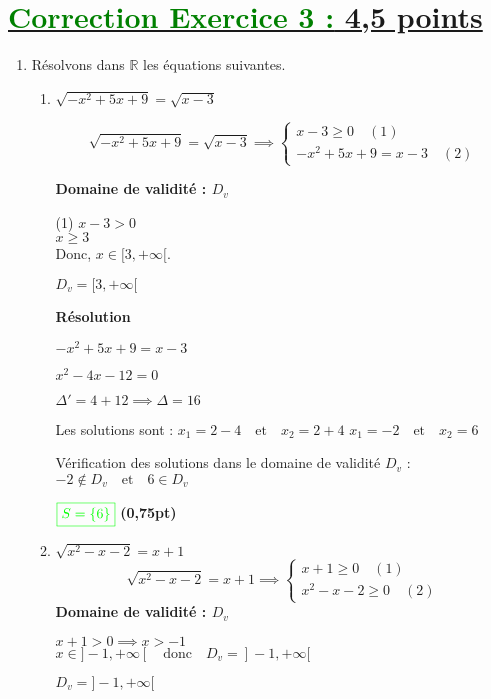 \documentclass[12pt,a4paper]{article}
\begin{document}
\section*{\underline{\textcolor{green}{Correction Exercice 3 :} 4,5 points}}
\begin{enumerate}
    \item Résolvons dans $\mathbb{R}$ les équations suivantes.
    \begin{enumerate}
        \item $\sqrt{-x^2 + 5x + 9} = \sqrt{x - 3}$ 
        
\[
\sqrt{-x^2 + 5x + 9} = \sqrt{x-3}\implies
\begin{cases}
x - 3 \geq 0 \quad (1) \\
-x^2 + 5x + 9 =x-3 \quad (2)
\end{cases}
\]

\textbf{Domaine de validité : \( D_v \)}

(1) \( x - 3 > 0 \)  \\
   \(
   x \geq 3
   \)\\
   Donc, \( x \in [3, +\infty[ \).

    \underline{\( D_v = [3, +\infty[ \)}

\textbf{Résolution}
 
\(
-x^2 + 5x + 9 = x - 3
\)
 
\(
x^2 - 4x - 12 = 0
\)

\(
\Delta' = 4 + 12 \implies \Delta = 16
\)

Les solutions sont :  
\(
x_1 = 2 - 4 \quad \text{et} \quad x_2 = 2 + 4
\)
\(
x_1 = -2 \quad \text{et} \quad x_2 = 6
\)

\noindent Vérification des solutions dans le domaine de validité \( D_v \) :  
\(
-2 \notin D_v \quad \text{et} \quad 6 \in D_v
\)

\(
\textcolor{green}{\boxed{S = \{ 6 \}  }}
\)  \hfill \textbf{(0,75pt)}
\item $ \sqrt{x^2 - x - 2} = x + 1 $
\[
\sqrt{x^2 - x - 2} = x + 1\implies
\begin{cases}
x + 1 \geq 0 \quad (1) \\
x^2 - x - 2 \geq 0 \quad (2)
\end{cases}
\]
\textbf{Domaine de validité : \( D_v \)}

\( x + 1 > 0 \implies x > -1 \) \\  
\( x \in ]-1, +\infty[ \quad \text{donc} \quad D_v = ]-1, +\infty[ \)

\underline{\( D_v = ]-1, +\infty[ \)}


\end{enumerate}
\end{enumerate}
\end{document}
